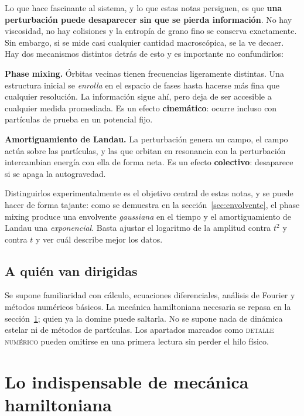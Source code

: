 \documentclass[11pt,a4paper]{article}
\theoremstyle{definition}
\begin{document}
Lo que hace fascinante al sistema, y lo que estas notas persiguen, es que
\textbf{una perturbación puede desaparecer sin que se pierda información}. No hay
viscosidad, no hay colisiones y la entropía de grano fino se conserva exactamente.
Sin embargo, si se mide casi cualquier cantidad macroscópica, se la ve decaer. Hay
dos mecanismos distintos detrás de esto y es importante no confundirlos:

\begin{idea}
\textbf{Phase mixing.} Órbitas vecinas tienen frecuencias ligeramente distintas.
Una estructura inicial se \emph{enrolla} en el espacio de fases hasta hacerse
más fina que cualquier resolución. La información sigue ahí, pero deja de ser
accesible a cualquier medida promediada. Es un efecto \textbf{cinemático}: ocurre
incluso con partículas de prueba en un potencial fijo.

\medskip
\textbf{Amortiguamiento de Landau.} La perturbación genera un campo, el campo
actúa sobre las partículas, y las que orbitan en resonancia con la perturbación
intercambian energía con ella de forma neta. Es un efecto \textbf{colectivo}:
desaparece si se apaga la autogravedad.
\end{idea}

Distinguirlos experimentalmente es el objetivo central de estas notas, y se puede
hacer de forma tajante: como se demuestra en la sección~\ref{sec:envolvente}, el
phase mixing produce una envolvente \emph{gaussiana} en el tiempo y el
amortiguamiento de Landau una \emph{exponencial}. Basta ajustar el logaritmo de la
amplitud contra $t^2$ y contra $t$ y ver cuál describe mejor los datos.

\subsection*{A quién van dirigidas}

Se supone familiaridad con cálculo, ecuaciones diferenciales, análisis de Fourier y
métodos numéricos básicos. La mecánica hamiltoniana necesaria se repasa en la
sección~\ref{sec:hamilton}; quien ya la domine puede saltarla. No se supone nada de
dinámica estelar ni de métodos de partículas. Los apartados marcados como
\textsc{detalle numérico} pueden omitirse en una primera lectura sin perder el hilo
físico.

\section{Lo indispensable de mecánica hamiltoniana}
\label{sec:hamilton}
\end{document}
